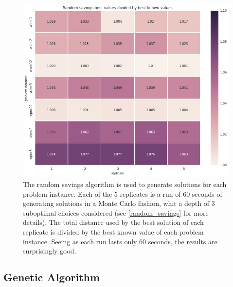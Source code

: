 \documentclass{article} %
\begin{document}
\begin{figure}[!htb]
\begin{center}
 \includegraphics[scale=0.45]{figures/rs_best}
 \caption{\small The random savings algorithm is used to generate solutions for each problem instance. Each of the 5 replicates is a run of 60 seconds of generating solutions in a Monte Carlo fashion, whit a depth of 3 suboptimal choices considered (see \ref{random_savings} for more details). The total distance used by the best solution of each replicate is divided by the best known value of each problem instance. Seeing as each run lasts only 60 seconds, the results are surprisingly good.}
 \label{rs_fig}
 \end{center}
\end{figure}


\newpage
\subsection{Genetic Algorithm}
\end{document}
